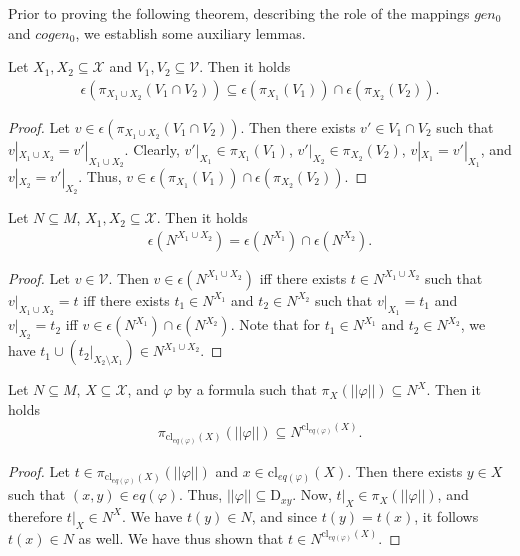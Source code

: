 \documentclass{lmcs}
\def\tu#1{( #1)}
\def\D{\textrm{D}}
\def\X{\mathcal X}
\def\V{\mathcal V}
\def\eq{eq}
\def\cl{\textrm{cl}}
\def\gen{gen}
\def\cogen{cogen}
\def\genz{\gen_0}
\def\cogenz{\cogen_0}
\begin{document}
Prior to proving the following theorem, describing the role of the mappings $\genz$ and $\cogenz$, 
we establish some auxiliary lemmas.

\begin{lem}\label{lem:cap_project}
Let $X_1,X_2\subseteq\X$ and $V_1,V_2\subseteq\V$. Then it holds
\begin{align*}
\epsilon(\pi_{X_1\cup X_2}(V_1\cap V_2))\subseteq\epsilon(\pi_{X_1}(V_1))\cap\epsilon(\pi_{X_2}(V_2)).
\end{align*}
\end{lem}
\begin{proof}
Let $v\in\epsilon(\pi_{X_1\cup X_2}(V_1\cap V_2))$. Then there exists $v'\in V_1\cap V_2$ such that $v|_{X_1\cup X_2}=v'|_{X_1\cup X_2}$. Clearly, $v'|_{X_1}\in\pi_{X_1}(V_1)$, $v'|_{X_2}\in\pi_{X_2}(V_2)$, $v|_{X_1}=v'|_{X_1}$, and $v|_{X_2}=v'|_{X_2}$. Thus, $v\in\epsilon(\pi_{X_1}(V_1))\cap\epsilon(\pi_{X_2}(V_2))$. 
\end{proof}


\begin{lem}\label{lem:cap_dom}
Let $N\subseteq M$, $X_1,X_2\subseteq\X$. Then it holds
\begin{align*}
\epsilon(N^{X_1\cup X_2})=\epsilon(N^{X_1})\cap\epsilon(N^{X_2}). 
\end{align*}
\end{lem}
\begin{proof}
Let $v\in\V$. Then $v\in\epsilon(N^{X_1\cup X_2})$ if{}f there exists $t\in N^{X_1\cup X_2}$ such that $v|_{X_1\cup X_2}=t$ if{}f there exists $t_1\in N^{X_1}$ and $t_2\in N^{X_2}$ such that $v|_{X_1}=t_1$ and $v|_{X_2}=t_2$ if{}f $v\in\epsilon(N^{X_1})\cap\epsilon(N^{X_2})$. Note that for $t_1\in N^{X_1}$ and $t_2\in N^{X_2}$, we have $t_1\cup(t_2|_{X_2\setminus X_1})\in N^{X_1\cup X_2}$.
\end{proof}

\begin{lem}\label{lem:eq_dom}
Let $N\subseteq M$, $X\subseteq\X$, and $\varphi$ by a formula such that $\pi_X(||\varphi||)\subseteq N^X$. Then it holds
\begin{align*}
\pi_{\cl_{\eq(\varphi)}(X)}(||\varphi||)\subseteq N^{\cl_{\eq(\varphi)}(X)}. 
\end{align*}
\end{lem}
\begin{proof}
Let $t\in\pi_{\cl_{\eq(\varphi)}(X)}(||\varphi||)$ and $x\in\cl_{\eq(\varphi)}(X)$. Then there exists $y\in X$ such that $\tu{x,y}\in\eq(\varphi)$. Thus, $||\varphi||\subseteq\D_{xy}$.  Now, $t|_X\in\pi_X(||\varphi||)$, and therefore $t|_X\in N^X$. We have $t(y)\in N$, and since $t(y)=t(x)$, it follows $t(x)\in N$ as well. We have thus shown that $t\in N^{\cl_{\eq(\varphi)}(X)}$.
\end{proof}
\end{document}
